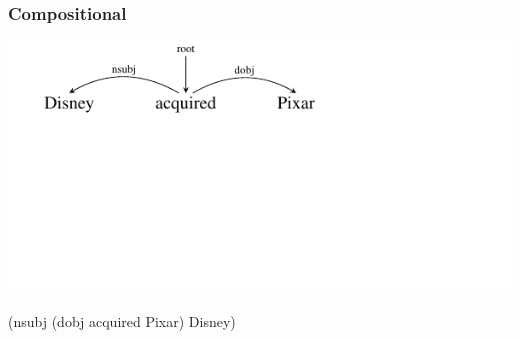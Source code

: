 \documentclass[mathserif,12pt]{beamer}
\begin{document}
\begin{frame}[noframenumbering]
\frametitle{Compositional}
\begin{center}
\includegraphics[trim=2em 9.4em 10em 0em,clip=true,scale=1.3]{figures/pixar}

\vspace{3em}
(nsubj (dobj acquired Pixar) Disney)
\vspace{3em}

\end{center}
\end{frame}
\end{document}
